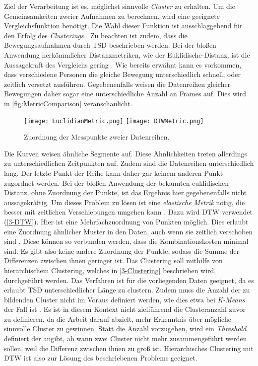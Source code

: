 Ziel der Verarbeitung ist es, möglichst sinnvolle \emph{Cluster} zu erhalten.
Um die Gemeinsamkeiten zweier Aufnahmen zu berechnen,
wird eine geeignete Vergleichsfunktion benötigt.
Die Wahl dieser Funktion ist ausschlaggebend für den Erfolg des \emph{Clusterings} \citep{warren_liao_clustering_2005}.
Zu beachten ist zudem, dass die Bewegungsaufnahmen durch \ac{TSD} beschrieben werden.
Bei der bloßen Anwendung herkömmlicher Distanzmetriken, wie der Euklidische-Distanz,
ist die Aussagekraft des Vergleichs gering \citep{warren_liao_clustering_2005}.
Wie bereits erwähnt kann es vorkommen, dass verschiedene Personen die gleiche Bewegung unterschiedlich schnell,
oder zeitlich versetzt ausführen.
Gegebenenfalls weisen die Datenreihen gleicher Bewegungen daher sogar eine unterschiedliche Anzahl an Frames auf.
Dies wird in \autoref{fig:MetricComparison} veranschaulicht.
\begin{figure}[ht]
    \begin{center}
    \texttt{[image: EuclidianMetric.png]}
    \texttt{[image: DTWMetric.png]}
    \end{center}
    \caption{Zuordnung der Messpunkte zweier Datenreihen.}
    \label{fig:MetricComparison}
\end{figure}
Die Kurven weisen ähnliche Segmente auf.
Diese Ähnlichkeiten treten allerdings zu unterschiedlichen Zeitpunkten auf.
Zudem sind die Datenreihen unterschiedlich lang.
Der letzte Punkt der Reihe kann daher gar keinem anderen Punkt zugordnet werden.
Bei der bloßen Anwendung der bekannten euklidischen Distanz,
ohne Zuordnung der Punkte, ist das Ergebnis hier gegebenenfalls nicht aussagekräftig.
Um dieses Problem zu lösen ist eine \emph{elastische Metrik} nötig,
die besser mit zeitlichen Verschiebungen umgehen kann \citep{aghabozorgi_time-series_2015}.
Dazu wird \ac{DTW} verwendet (\autoref{3-DTW}).
Hier ist eine Mehrfachzuordnung von Punkten möglich.
Dies erlaubt eine Zuordnung ähnlicher Muster in den Daten, auch wenn sie zeitlich verschoben sind \citet{mohammadzade_dynamic_2021}.
Diese können so verbunden werden, dass die Kombinationskosten minimal sind.
Es gibt also keine andere Zuordnung der Punkte,
sodass die Summe der Differenzen zwischen ihnen geringer ist.
Das Clustering soll mithilfe von hierarchischem Clustering,
welches in \autoref{3-Clustering} beschrieben wird, durchgeführt werden.
Das Verfahren ist für die vorliegenden Daten geeignet,
da es erlaubt \ac{TSD} unterschiedlicher Länge zu clustern.
Zudem muss die Anzahl der zu bildenden Cluster nicht im Voraus definiert werden,
wie dies etwa bei \emph{K-Means} der Fall ist \citep{aghabozorgi_time-series_2015}.
Es ist in diesem Kontext nicht zielführend die Clusteranzahl zuvor zu definieren,
da die Arbeit darauf abzielt, mehr Erkenntnis über mögliche sinnvolle Cluster zu gewinnen.
Statt die Anzahl vorzugeben, wird ein \emph{Threshold} definiert der angibt,
ab wann zwei Cluster nicht mehr zusammengeführt werden sollen,
weil die Differenz zwischen ihnen zu groß ist.
Hierarchisches Clustering mit \ac{DTW} ist also zur Lösung des beschriebenen Problems geeignet.
